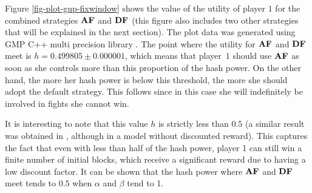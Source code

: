 Figure \ref{fig-plot-gup-fixwindow} shows the value of the utility of player $1$ for the combined strategies $\text{\rm {\bf AF}}$ and $\text{\rm {\bf DF}}$ (this figure also includes two other strategies that will be explained in the next section). The plot data was generated using GMP C++ multi precision library \cite{gmp}. The point where the utility for $\text{\rm {\bf AF}}$ and $\text{\rm {\bf DF}}$ meet is $h = 0.499805 \pm 0.000001$, which means that player~$1$ should use $\text{\rm {\bf AF}}$ as soon as she controls more than this proportion of the hash power. On the other hand, the more her hash power is below this threshold, the more she should adopt the default strategy. This follows since in this case she will indefinitely be involved in fights she cannot win.

It is interesting to note that this value $h$ is strictly less than $0.5$ (a similar result was obtained in \cite{mininggames:2016},  although in a model without discounted reward). This captures the fact that even with less than half of the hash power, player 1 can still win a finite number of initial blocks, which receive a significant reward due to having a low discount factor. It can be shown that the hash power where $\text{\rm {\bf AF}}$ and $\text{\rm {\bf DF}}$ meet tends to $0.5$ when $\alpha$ and $\beta$ tend to 1.









